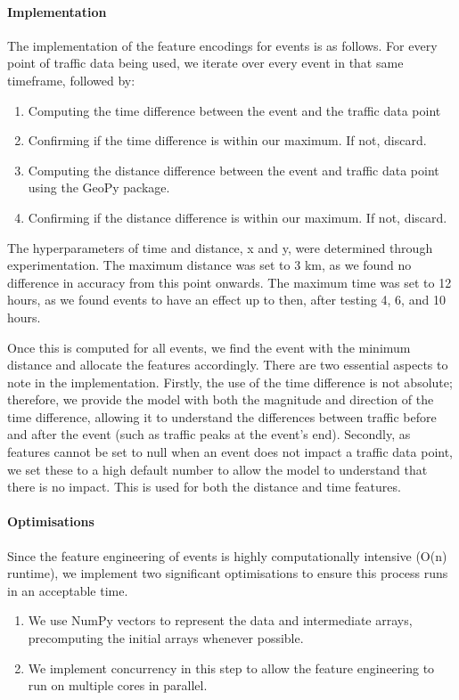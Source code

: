 \paragraph{Implementation}
The implementation of the feature encodings for events is as follows. For every point of traffic data being used, we iterate over every event in that same timeframe, followed by:
\begin{enumerate}
    \item Computing the time difference between the event and the traffic data point
    \item Confirming if the time difference is within our maximum. If not, discard.
    \item Computing the distance difference between the event and traffic data point using the GeoPy package.
    \item Confirming if the distance difference is within our maximum. If not, discard.
\end{enumerate}

The hyperparameters of time and distance, x and y, were determined through experimentation. The maximum distance was set to 3 km, as we found no difference in accuracy from this point onwards. The maximum time was set to 12 hours, as we found events to have an effect up to then, after testing 4, 6, and 10 hours.

Once this is computed for all events, we find the event with the minimum distance and allocate the features accordingly. There are two essential aspects to note in the implementation. Firstly, the use of the time difference is not absolute; therefore, we provide the model with both the magnitude and direction of the time difference, allowing it to understand the differences between traffic before and after the event (such as traffic peaks at the event's end). Secondly, as features cannot be set to null when an event does not impact a traffic data point, we set these to a high default number to allow the model to understand that there is no impact. This is used for both the distance and time features.

\paragraph{Optimisations}
Since the feature engineering of events is highly computationally intensive (O(n) runtime), we implement two significant optimisations to ensure this process runs in an acceptable time.

\begin{enumerate}
    \item We use NumPy vectors to represent the data and intermediate arrays, precomputing the initial arrays whenever possible.
    \item We implement concurrency in this step to allow the feature engineering to run on multiple cores in parallel.
\end{enumerate}

